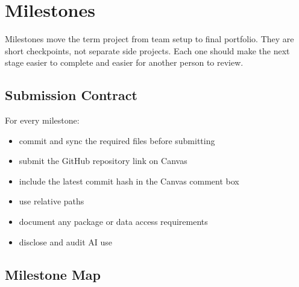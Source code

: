 \documentclass[
  letterpaper,
  DIV=11,
  numbers=noendperiod,
  oneside]{scrreprt}
\providecommand{\tightlist}{%
  \setlength{\itemsep}{0pt}\setlength{\parskip}{0pt}}
\begin{document}
\chapter*{Milestones}\label{milestones}


Milestones move the term project from team setup to final portfolio.
They are short checkpoints, not separate side projects. Each one should
make the next stage easier to complete and easier for another person to
review.

\section*{Submission Contract}\label{submission-contract}


For every milestone:

\begin{itemize}
\tightlist
\item
  commit and sync the required files before submitting
\item
  submit the GitHub repository link on Canvas
\item
  include the latest commit hash in the Canvas comment box
\item
  use relative paths
\item
  document any package or data access requirements
\item
  disclose and audit AI use
\end{itemize}

\section*{Milestone Map}\label{milestone-map}

\end{document}
